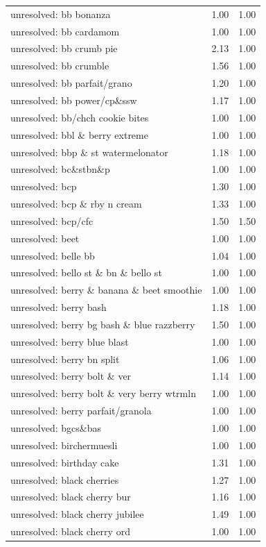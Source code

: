 \begin{table}
\begin{tabular}{lrr}
unresolved: bb bonanza & 1.00 & 1.00 \\
unresolved: bb cardamom & 1.00 & 1.00 \\
unresolved: bb crumb pie & 2.13 & 1.00 \\
unresolved: bb crumble & 1.56 & 1.00 \\
unresolved: bb parfait/grano & 1.20 & 1.00 \\
unresolved: bb power/cp\&ssw & 1.17 & 1.00 \\
unresolved: bb/chch cookie bites & 1.00 & 1.00 \\
unresolved: bbl \& berry extreme & 1.00 & 1.00 \\
unresolved: bbp \& st watermelonator & 1.18 & 1.00 \\
unresolved: bc\&stbn\&p & 1.00 & 1.00 \\
unresolved: bcp & 1.30 & 1.00 \\
unresolved: bcp \& rby n cream & 1.33 & 1.00 \\
unresolved: bcp/cfc & 1.50 & 1.50 \\
unresolved: beet & 1.00 & 1.00 \\
unresolved: belle bb & 1.04 & 1.00 \\
unresolved: bello st \& bn \& bello st & 1.00 & 1.00 \\
unresolved: berry \& banana \& beet smoothie & 1.00 & 1.00 \\
unresolved: berry bash & 1.18 & 1.00 \\
unresolved: berry bg bash \& blue razzberry & 1.50 & 1.00 \\
unresolved: berry blue blast & 1.00 & 1.00 \\
unresolved: berry bn split & 1.06 & 1.00 \\
unresolved: berry bolt \& ver & 1.14 & 1.00 \\
unresolved: berry bolt \& very berry wtrmln & 1.00 & 1.00 \\
unresolved: berry parfait/granola & 1.00 & 1.00 \\
unresolved: bgcs\&bas & 1.00 & 1.00 \\
unresolved: birchermuesli & 1.00 & 1.00 \\
unresolved: birthday cake & 1.31 & 1.00 \\
unresolved: black cherries & 1.27 & 1.00 \\
unresolved: black cherry bur & 1.16 & 1.00 \\
unresolved: black cherry jubilee & 1.49 & 1.00 \\
unresolved: black cherry ord & 1.00 & 1.00 \\

\end{tabular}
\end{table}
